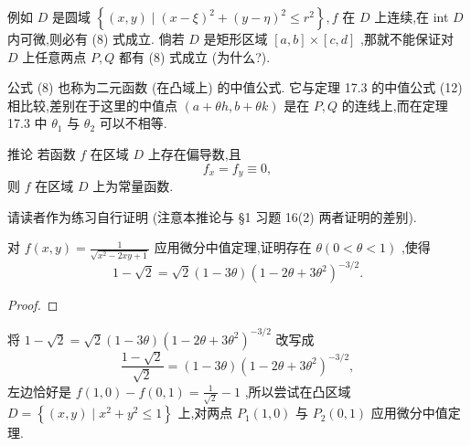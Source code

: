 例如 \(D\) 是圆域 \(\left\{  {\left( {x,y}\right)  \mid  {\left( x - \xi \right) }^{2} + {\left( y - \eta \right) }^{2} \leq  {r}^{2}}\right\}  ,f\) 在 \(D\) 上连续,在 int \(D\) 内可微,则必有 (8) 式成立. 倘若 \(D\) 是矩形区域 \(\left\lbrack  {a,b}\right\rbrack   \times  \left\lbrack  {c,d}\right\rbrack\) ,那就不能保证对 \(D\) 上任意两点 \(P,Q\) 都有 (8) 式成立 (为什么?).

公式 (8) 也称为二元函数 (在凸域上) 的中值公式. 它与定理 17.3 的中值公式 (12)相比较,差别在于这里的中值点 \(\left( {a + {\theta h},b + {\theta k}}\right)\) 是在 \(P,Q\) 的连线上,而在定理 17.3 中 \({\theta }_{1}\) 与 \({\theta }_{2}\) 可以不相等.

推论 若函数 \(f\) 在区域 \(D\) 上存在偏导数,且
\[
{f}_{x} = {f}_{y} \equiv  0,
\]
则 \(f\) 在区域 \(D\) 上为常量函数.

请读者作为练习自行证明 (注意本推论与 §1 习题 16(2) 两者证明的差别).

\begin{example}

\end{example}
对 \(f\left( {x,y}\right)  = \frac{1}{\sqrt{{x}^{2} - {2xy} + 1}}\) 应用微分中值定理,证明存在 \(\theta \left( {0 < \theta  < 1}\right)\) ,使得
\[
1 - \sqrt{2} = \sqrt{2}\left( {1 - {3\theta }}\right) {\left( 1 - 2\theta  + 3{\theta }^{2}\right) }^{-3/2}.
\]
\begin{proof}

\end{proof}
将 \(1 - \sqrt{2} = \sqrt{2}\left( {1 - {3\theta }}\right) {\left( 1 - 2\theta  + 3{\theta }^{2}\right) }^{-3/2}\) 改写成
\[
\frac{1 - \sqrt{2}}{\sqrt{2}} = \left( {1 - {3\theta }}\right) {\left( 1 - 2\theta  + 3{\theta }^{2}\right) }^{-3/2},
\]
左边恰好是 \(f\left( {1,0}\right)  - f\left( {0,1}\right)  = \frac{1}{\sqrt{2}} - 1\) ,所以尝试在凸区域 \(D = \left\{  {\left( {x,y}\right)  \mid  {x}^{2} + {y}^{2} \leq  1}\right\}\) 上,对两点 \({P}_{1}\left( {1,0}\right)\) 与 \({P}_{2}\left( {0,1}\right)\) 应用微分中值定理.

